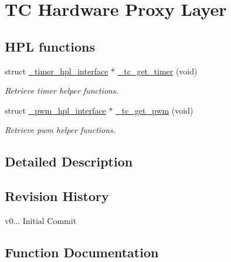 \hypertarget{group__tc__group}{}\section{TC Hardware Proxy Layer}
\label{group__tc__group}
\subsection*{H\+PL functions}
\begin{DoxyCompactItemize}
\item 
struct \hyperlink{struct__timer__hpl__interface}{\+\_\+timer\+\_\+hpl\+\_\+interface} $\ast$ \hyperlink{group__tc__group_gaac375bec08b476a19a893e462affce95}{\+\_\+tc\+\_\+get\+\_\+timer} (void)
\begin{DoxyCompactList}\small\item\em Retrieve timer helper functions. \end{DoxyCompactList}\item 
struct \hyperlink{struct__pwm__hpl__interface}{\+\_\+pwm\+\_\+hpl\+\_\+interface} $\ast$ \hyperlink{group__tc__group_gaffdfa66265d1088ae0661b8700032314}{\+\_\+tc\+\_\+get\+\_\+pwm} (void)
\begin{DoxyCompactList}\small\item\em Retrieve pwm helper functions. \end{DoxyCompactList}\end{DoxyCompactItemize}


\subsection{Detailed Description}
\hypertarget{group__tc__group_tc_hpl_rev}{}\subsection{Revision History}\label{group__tc__group_tc_hpl_rev}

\begin{DoxyItemize}
\item v0... Initial Commit 
\end{DoxyItemize}

\subsection{Function Documentation}
\mbox{\label{group__tc__group_gaffdfa66265d1088ae0661b8700032314}} 
